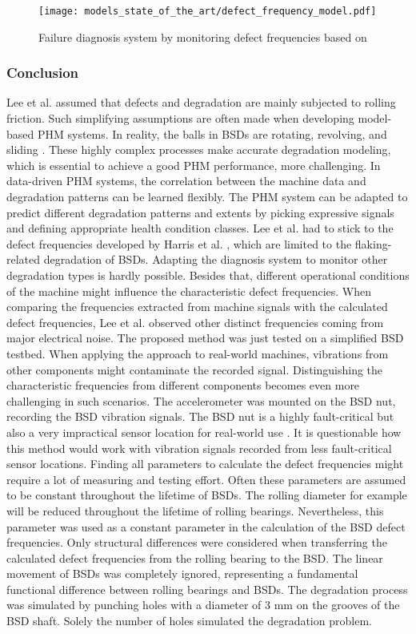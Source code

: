 \begin{figure}[H]
  \centering
  \texttt{[image: models\_state\_of\_the\_art/defect\_frequency\_model.pdf]}
  \caption{Failure diagnosis system by monitoring defect frequencies based on \cite{Lee2015}}
  \label{fig:defect_frequency_model}
\end{figure}

\subsubsection{Conclusion}
Lee et al. \cite{Lee2015} assumed that defects and degradation are mainly subjected to rolling friction. Such simplifying assumptions are often made when developing model-based PHM systems. In reality, the balls in BSDs are rotating, revolving, and sliding \cite{Lee2015}. These highly complex processes make accurate degradation modeling, which is essential to achieve a good PHM performance, more challenging. In data-driven PHM systems, the correlation between the machine data and degradation patterns can be learned flexibly. The PHM system can be adapted to predict different degradation patterns and extents by picking expressive signals and defining appropriate health condition classes. Lee et al. \cite{Lee2015} had to stick to the defect frequencies developed by Harris et al. \cite{Harris1996}, which are limited to the flaking-related degradation of BSDs. Adapting the diagnosis system to monitor other degradation types is hardly possible. Besides that, different operational conditions of the machine might influence the characteristic defect frequencies. When comparing the frequencies extracted from machine signals with the calculated defect frequencies, Lee et al. observed other distinct frequencies coming from major electrical noise. The proposed method was just tested on a simplified BSD testbed. When applying the approach to real-world machines, vibrations from other components might contaminate the recorded signal. Distinguishing the characteristic frequencies from different components becomes even more challenging in such scenarios. The accelerometer was mounted on the BSD nut, recording the BSD vibration signals. The BSD nut is a highly fault-critical but also a very impractical sensor location for real-world use \cite{Pandhare2021}. It is questionable how this method would work with vibration signals recorded from less fault-critical sensor locations. Finding all parameters to calculate the defect frequencies might require a lot of measuring and testing effort. Often these parameters are assumed to be constant throughout the lifetime of BSDs. The rolling diameter for example will be reduced throughout the lifetime of rolling bearings. Nevertheless, this parameter was used as a constant parameter in the calculation of the BSD defect frequencies. Only structural differences were considered when transferring the calculated defect frequencies from the rolling bearing to the BSD. The linear movement of BSDs was completely ignored, representing a fundamental functional difference between rolling bearings and BSDs. The degradation process was simulated by punching holes with a diameter of 3 mm on the grooves of the BSD shaft. Solely the number of holes simulated the degradation problem. 